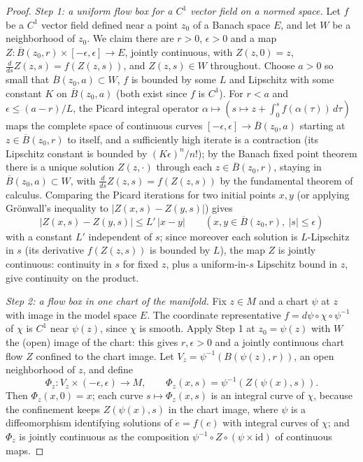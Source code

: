 \begin{proof}
\leanok
{\em Step 1: a uniform flow box for a $C^1$ vector field on a normed
space.} Let $f$ be a $C^1$ vector field defined near a point $z_0$ of a
Banach space $E$, and let $W$ be a neighborhood of $z_0$. We claim there
are $r>0$, $\epsilon>0$ and a map $Z\colon\overline B(z_0,r)\times
[-\epsilon,\epsilon]\to E$, jointly continuous, with $Z(z,0)=z$,
$\frac{d}{ds}Z(z,s)=f(Z(z,s))$, and $Z(z,s)\in W$ throughout. Choose
$a>0$ so small that $\overline B(z_0,a)\subset W$, $f$ is bounded by some
$L$ and Lipschitz with some constant $K$ on $\overline B(z_0,a)$ (both
exist since $f$ is $C^1$). For $r<a$ and $\epsilon\le(a-r)/L$, the Picard
integral operator $\alpha\mapsto\left(s\mapsto z+\int_0^s
f(\alpha(\tau))\,d\tau\right)$ maps the complete space of continuous
curves $[-\epsilon,\epsilon]\to\overline B(z_0,a)$ starting at
$z\in\overline B(z_0,r)$ to itself, and a sufficiently high iterate is a
contraction (its Lipschitz constant is bounded by $(K\epsilon)^n/n!$);
by the Banach fixed point theorem there is a unique solution
$Z(z,\cdot)$ through each $z\in\overline B(z_0,r)$, staying in
$\overline B(z_0,a)\subset W$, with
$\frac{d}{ds}Z(z,s)=f(Z(z,s))$ by the fundamental theorem of calculus.
Comparing the Picard iterations for two initial points $x,y$ (or applying
Gr\"onwall's inequality to $|Z(x,s)-Z(y,s)|$) gives
$$\left|Z(x,s)-Z(y,s)\right|\le L'\,|x-y|
\qquad\left(x,y\in\overline B(z_0,r),\ |s|\le\epsilon\right)$$
with a constant $L'$ independent of $s$; since moreover each solution is
$L$-Lipschitz in $s$ (its derivative $f(Z(z,s))$ is bounded by $L$), the
map $Z$ is jointly continuous: continuity in $s$ for fixed $z$, plus a
uniform-in-$s$ Lipschitz bound in $z$, give continuity on the product.

{\em Step 2: a flow box in one chart of the manifold.} Fix $z\in M$ and
a chart $\psi$ at $z$ with image in the model space $E$. The coordinate
representative $f=d\psi\circ\chi\circ\psi^{-1}$ of $\chi$ is $C^1$ near
$\psi(z)$, since $\chi$ is smooth. Apply Step 1 at $z_0=\psi(z)$ with
$W$ the (open) image of the chart: this gives $r,\epsilon>0$ and a
jointly continuous chart flow $Z$ confined to the chart image. Let
$V_z=\psi^{-1}\left(B(\psi(z),r)\right)$, an open neighborhood of $z$,
and define
$$\Phi_z\colon V_z\times(-\epsilon,\epsilon)\to M,\qquad
\Phi_z(x,s)=\psi^{-1}\left(Z(\psi(x),s)\right).$$
Then $\Phi_z(x,0)=x$; each curve $s\mapsto\Phi_z(x,s)$ is an integral
curve of $\chi$, because the confinement keeps $Z(\psi(x),s)$ in the
chart image, where $\psi$ is a diffeomorphism identifying solutions of
$\dot e=f(e)$ with integral curves of $\chi$; and $\Phi_z$ is jointly
continuous as the composition $\psi^{-1}\circ Z\circ(\psi\times
\mathrm{id})$ of continuous maps.


\end{proof}
